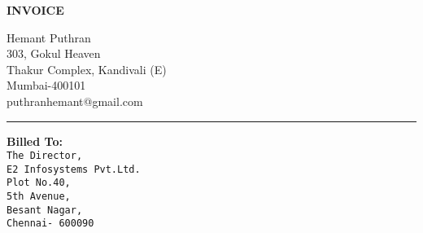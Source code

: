 \documentclass[]{invoice-style}
\begin{document}
\begin{minipage}[t][60em][c]{\textwidth}
\begin{minipage}[][12em][c]{\textwidth}
\begin{minipage}[][9em][c]{0.3\textwidth}
        {\Huge \textbf{INVOICE} }
\end{minipage}
\hfill
\begin{minipage}[][9em][c]{0.4\textwidth}
\begin{flushright}
        {\large Hemant Puthran\\ 303, Gokul Heaven\\Thakur Complex, Kandivali (E)\\Mumbai-400101\\ puthranhemant@gmail.com\\}
        \end{flushright}
\end{minipage}
\end{minipage}
\hrule
\begin{minipage}[][17em][c]{\textwidth} 
	\begin{minipage}[c][13em][t]{.49\textwidth} 
	\begin{center}
	    {\bfseries \Large Billed To:}\vspace{.25cm}\\{\Large {\tt The Director,\\E2 Infosystems Pvt.Ltd.\\
	    Plot No.40,\\ 5th Avenue,\\Besant Nagar,\vspace{.25cm}\\Chennai- 600090}}
	\end{center}
	\end{minipage}%
	\hfill
\begin{minipage}[c][13em][t]{.49\textwidth}   


\end{minipage}
\end{minipage}
\end{minipage}
\end{document}
